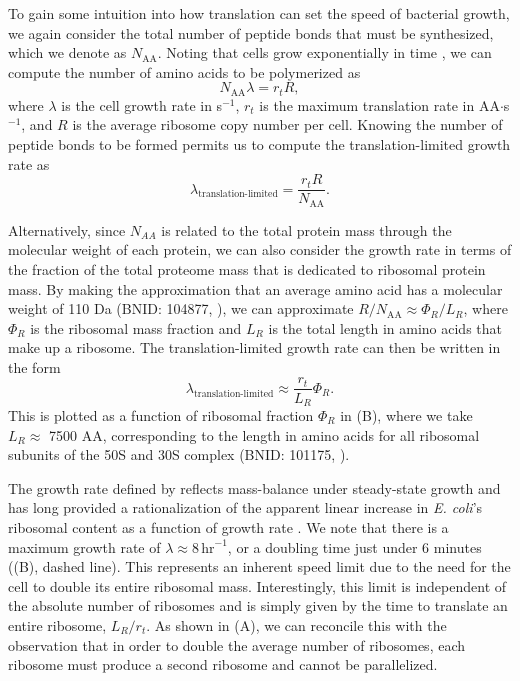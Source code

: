 To gain some intuition into how translation can set the speed of
bacterial growth, we again consider the total number of peptide bonds that must
be synthesized, which we denote as $N_\text{AA}$. Noting that cells grow exponentially in time
\citep{godin2010}, we can compute the number of amino acids to be polymerized as
\begin{equation}
    N_\text{AA} \lambda = r_t R,
\end{equation} where
$\lambda$ is the cell growth rate in s$^{-1}$, $r_t$ is the maximum translation
rate in AA$\cdot$s$^{-1}$, and $R$ is the average ribosome copy number per
cell. Knowing the number of peptide bonds to be formed permits us to compute the
translation-limited growth rate as
\begin{equation}
\lambda_\text{translation-limited} = \frac{r_t R}{N_\text{AA}}.
\end{equation}

Alternatively, since $N_{AA}$ is related to the total protein mass through the
molecular weight of each protein, we can also consider the growth rate in terms
of the fraction of the total proteome mass that is dedicated to ribosomal
protein mass. By making the approximation that an average amino acid has a
molecular weight of 110 Da (BNID: 104877, \cite{milo2010}), we can approximate  $R
/ N_\text{AA} \approx \Phi_R / L_R$,  where $\Phi_R$ is the ribosomal mass
fraction and $L_R$ is the total length in amino acids that make up a ribosome.
The translation-limited growth rate can then be written in the form
\begin{equation}
\lambda_{\textrm{translation-limited}} \approx \frac{r_t}{L_R}  \Phi_R.
\label{eq:translation_limit_growth_rate}
\end{equation}
This is plotted as a function of ribosomal fraction $\Phi_R$ in
(B), where we take $L_R \approx$ 7500 AA, corresponding to
the length in amino acids for all ribosomal subunits of the 50S and 30S complex
(BNID: 101175, \citep{milo2010}).

The growth rate defined by 
reflects mass-balance under steady-state growth and has long provided a
rationalization of the apparent linear increase in \textit{E. coli}'s ribosomal
content as a function of growth rate \citep{Goldberger1979, scott2010}.
We note that there is a maximum growth rate of $\lambda \approx 8
\,\text{hr}^{-1}$, or a doubling time just under 6 minutes
((B), dashed line). This represents an inherent speed limit
due to the need for the cell to double its entire ribosomal mass. Interestingly,
this limit is independent of the absolute number of ribosomes and is simply
given by the time to translate an entire ribosome, $L_R/ r_t$. As shown in
(A), we can reconcile this with the observation that in
order to double the average number of ribosomes, each ribosome must produce a
second ribosome and cannot be parallelized.

